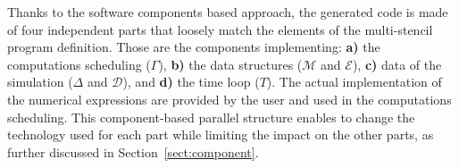 Thanks to the software components based approach, the generated code is made of four independent parts that loosely match the elements of the multi-stencil program definition.
Those are the components implementing: \textbf{a)} the computations scheduling ($\Gamma$), \textbf{b)} the data structures ($\mathcal{M}$ and $\mathcal{E}$), \textbf{c)} data of the simulation ($\Delta$ and $\mathcal{D}$), and \textbf{d)} the time loop ($T$). The actual implementation of the numerical expressions are provided by the user and used in the computations scheduling.
This component-based parallel structure enables to change the technology used for each part while limiting the impact on the other parts, as further discussed in Section~\ref{sect:component}.






 


